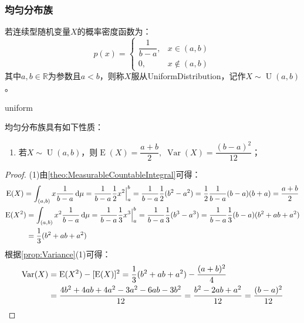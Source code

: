 \subsubsection{均匀分布族}
\begin{definition}
	若连续型随机变量$X$的概率密度函数为：
	\begin{equation*}
		p(x)=
		\begin{cases}
			\dfrac{1}{b-a}, &x\in(a,b) \\
			0, &x\notin(a,b)
		\end{cases}
	\end{equation*}
	其中$a,b\in\mathbb{R}$为参数且$a<b$，则称$X$服从\gls{UniformDistribution}，记作$X\sim\operatorname{U}(a,b)$。
\end{definition}
\begin{densityplot}{uniform}
	\caption{均匀分布 $\operatorname{U}(0,1)$ 的概率密度函数}
\end{densityplot}
\begin{property}
	均匀分布族具有如下性质：
	\begin{enumerate}
		\item 若$X\sim\operatorname{U}(a,b)$，则$\operatorname{E}(X)=\dfrac{a+b}{2},\;\operatorname{Var}(X)=\dfrac{(b-a)^2}{12}$；
	\end{enumerate}
\end{property}
\begin{proof}
	(1)由\cref{theo:MeasurableCountableIntegral}可得：
	\begin{gather*}
		\operatorname{E}(X)=\int_{(a,b)}x\frac{1}{b-a}\mathop{}\!\mathrm{d}\mu=\frac{1}{b-a}\frac{1}{2}x^2\Big|_a^b=\frac{1}{b-a}\frac{1}{2}(b^2-a^2)=\frac{1}{2}\frac{1}{b-a}(b-a)(b+a)=\frac{a+b}{2} \\
		\begin{aligned}
			\operatorname{E}(X^2)&=\int_{(a,b)}x^2\frac{1}{b-a}\mathop{}\!\mathrm{d}\mu=\frac{1}{b-a}\frac{1}{3}x^3\Big|_a^b=\frac{1}{b-a}\frac{1}{3}(b^3-a^3)=\frac{1}{b-a}\frac{1}{3}(b-a)(b^2+ab+a^2) \\
			&=\frac{1}{3}(b^2+ab+a^2)
		\end{aligned}
	\end{gather*}
	根据\cref{prop:Variance}(1)可得：
	\begin{align*}
		\operatorname{Var}(X)&=\operatorname{E}(X^2)-[\operatorname{E}(X)]^2=\frac{1}{3}(b^2+ab+a^2)-\frac{(a+b)^2}{4} \\
		&=\frac{4b^2+4ab+4a^2-3a^2-6ab-3b^2}{12}=\frac{b^2-2ab+a^2}{12}=\frac{(b-a)^2}{12}\qedhere
	\end{align*}
\end{proof}

